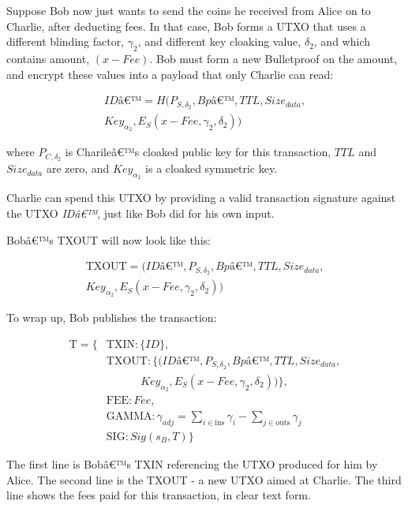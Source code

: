\documentclass[8pt,fleqn,openany]{book}
\begin{document}
{		Suppose Bob now just wants to send the coins he received from Alice on to Charlie, after deducting fees. In that case, Bob forms a UTXO that uses a different blinding factor, $\gamma_2$, and different key cloaking value, $\delta_2$, and which contains amount, $(x - \mathit{Fee})$. Bob must form a new Bulletproof on the amount, and encrypt these values into a payload that only Charlie can read:
		
		\begin{multline*}
		IDâ€™ = H(P_{S, \delta_2}, Bpâ€™, TTL, Size_{data}, \\
		Key_{\alpha_2}, E_S(x - Fee, \gamma_2, \delta_2))
		\end{multline*}
		
		where $P_{C, \delta_2}$ is Charileâ€™s cloaked public key for this transaction, $TTL$ and $Size_{data}$ are zero, and $Key_{\alpha_2}$ is a cloaked symmetric key. 
		
		Charlie can spend this UTXO by providing a valid transaction signature against the UTXO \textit{IDâ€™}, just like Bob did for his own input. 
		
		Bobâ€™s TXOUT will now look like this:
		
		\begin{multline*}
		\text{TXOUT} = (IDâ€™, P_{S, \delta_2}, Bpâ€™, TTL, Size_{data},\\ 
		Key_{\alpha_2}, E_S(x - Fee, \gamma_2, \delta_2))
		\end{multline*}
		
		To wrap up, Bob publishes the transaction:
		
		\begin{align*}
		\text{T} = \{&\text{TXIN} : \{\mathit{ID}\}, \\
		&\text{TXOUT} : \{(IDâ€™, P_{S, \delta_2}, Bpâ€™, TTL, Size_{data}, \\
		& \ \ \ \ \ \ \ \ \ \ \ \ \ \ Key_{\alpha_2}, E_S(x - Fee, \gamma_2, \delta_2))\}, \\
		&\text{FEE} : \mathit{Fee}, \\
		&\text{GAMMA} : \gamma_{\mathit{adj}} = \sum_{i \in \text{ins}}{\gamma_i} - \sum_{j \in \text{outs}}{\gamma_j}\\
		&\text{SIG} : \mathit{Sig}(s_B, T)\}
		\end{align*}
		
		The first line is Bobâ€™s TXIN referencing the UTXO produced for him by Alice. The second line is the TXOUT - a new UTXO aimed at Charlie. The third line shows the fees paid for this transaction, in clear text form. 
		
}
\end{document}
